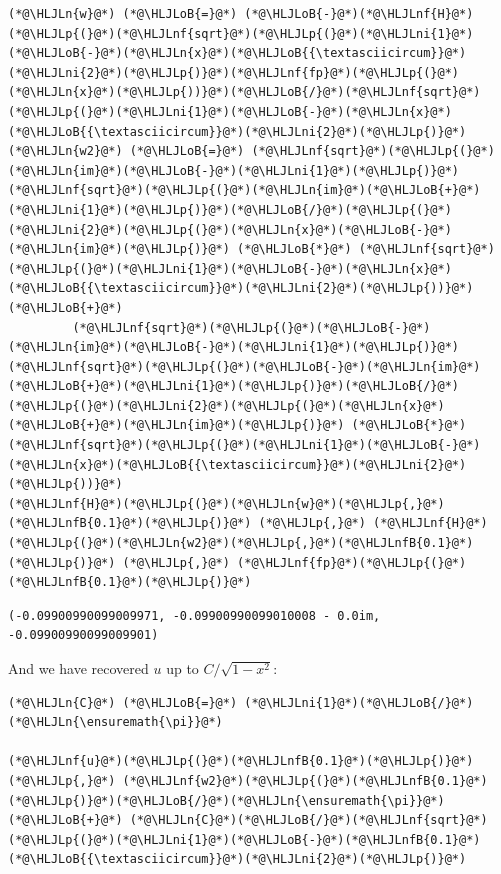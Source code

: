 \documentclass[12pt,a4paper]{article}
\newcommand{\HLJLn}[1]{#1}
\newcommand{\HLJLnf}[1]{\textcolor[RGB]{66,102,213}{#1}}
\newcommand{\HLJLnfB}[1]{\textcolor[RGB]{59,151,46}{#1}}
\newcommand{\HLJLni}[1]{\textcolor[RGB]{59,151,46}{#1}}
\newcommand{\HLJLoB}[1]{\textcolor[RGB]{102,102,102}{\textbf{#1}}}
\newcommand{\HLJLp}[1]{#1}
\begin{document}
\begin{lstlisting}
(*@\HLJLn{w}@*) (*@\HLJLoB{=}@*) (*@\HLJLoB{-}@*)(*@\HLJLnf{H}@*)(*@\HLJLp{(}@*)(*@\HLJLnf{sqrt}@*)(*@\HLJLp{(}@*)(*@\HLJLni{1}@*)(*@\HLJLoB{-}@*)(*@\HLJLn{x}@*)(*@\HLJLoB{{\textasciicircum}}@*)(*@\HLJLni{2}@*)(*@\HLJLp{)}@*)(*@\HLJLnf{fp}@*)(*@\HLJLp{(}@*)(*@\HLJLn{x}@*)(*@\HLJLp{))}@*)(*@\HLJLoB{/}@*)(*@\HLJLnf{sqrt}@*)(*@\HLJLp{(}@*)(*@\HLJLni{1}@*)(*@\HLJLoB{-}@*)(*@\HLJLn{x}@*)(*@\HLJLoB{{\textasciicircum}}@*)(*@\HLJLni{2}@*)(*@\HLJLp{)}@*)
(*@\HLJLn{w2}@*) (*@\HLJLoB{=}@*) (*@\HLJLnf{sqrt}@*)(*@\HLJLp{(}@*)(*@\HLJLn{im}@*)(*@\HLJLoB{-}@*)(*@\HLJLni{1}@*)(*@\HLJLp{)}@*)(*@\HLJLnf{sqrt}@*)(*@\HLJLp{(}@*)(*@\HLJLn{im}@*)(*@\HLJLoB{+}@*)(*@\HLJLni{1}@*)(*@\HLJLp{)}@*)(*@\HLJLoB{/}@*)(*@\HLJLp{(}@*)(*@\HLJLni{2}@*)(*@\HLJLp{(}@*)(*@\HLJLn{x}@*)(*@\HLJLoB{-}@*)(*@\HLJLn{im}@*)(*@\HLJLp{)}@*) (*@\HLJLoB{*}@*) (*@\HLJLnf{sqrt}@*)(*@\HLJLp{(}@*)(*@\HLJLni{1}@*)(*@\HLJLoB{-}@*)(*@\HLJLn{x}@*)(*@\HLJLoB{{\textasciicircum}}@*)(*@\HLJLni{2}@*)(*@\HLJLp{))}@*) (*@\HLJLoB{+}@*)
         (*@\HLJLnf{sqrt}@*)(*@\HLJLp{(}@*)(*@\HLJLoB{-}@*)(*@\HLJLn{im}@*)(*@\HLJLoB{-}@*)(*@\HLJLni{1}@*)(*@\HLJLp{)}@*)(*@\HLJLnf{sqrt}@*)(*@\HLJLp{(}@*)(*@\HLJLoB{-}@*)(*@\HLJLn{im}@*)(*@\HLJLoB{+}@*)(*@\HLJLni{1}@*)(*@\HLJLp{)}@*)(*@\HLJLoB{/}@*)(*@\HLJLp{(}@*)(*@\HLJLni{2}@*)(*@\HLJLp{(}@*)(*@\HLJLn{x}@*)(*@\HLJLoB{+}@*)(*@\HLJLn{im}@*)(*@\HLJLp{)}@*) (*@\HLJLoB{*}@*) (*@\HLJLnf{sqrt}@*)(*@\HLJLp{(}@*)(*@\HLJLni{1}@*)(*@\HLJLoB{-}@*)(*@\HLJLn{x}@*)(*@\HLJLoB{{\textasciicircum}}@*)(*@\HLJLni{2}@*)(*@\HLJLp{))}@*)
(*@\HLJLnf{H}@*)(*@\HLJLp{(}@*)(*@\HLJLn{w}@*)(*@\HLJLp{,}@*)(*@\HLJLnfB{0.1}@*)(*@\HLJLp{)}@*) (*@\HLJLp{,}@*) (*@\HLJLnf{H}@*)(*@\HLJLp{(}@*)(*@\HLJLn{w2}@*)(*@\HLJLp{,}@*)(*@\HLJLnfB{0.1}@*)(*@\HLJLp{)}@*) (*@\HLJLp{,}@*) (*@\HLJLnf{fp}@*)(*@\HLJLp{(}@*)(*@\HLJLnfB{0.1}@*)(*@\HLJLp{)}@*)
\end{lstlisting}

\begin{lstlisting}
(-0.09900990099009971, -0.09900990099010008 - 0.0im, -0.09900990099009901)
\end{lstlisting}


And we have recovered $u$ up to $C/\sqrt{1-x^2}$:


\begin{lstlisting}
(*@\HLJLn{C}@*) (*@\HLJLoB{=}@*) (*@\HLJLni{1}@*)(*@\HLJLoB{/}@*)(*@\HLJLn{\ensuremath{\pi}}@*)

(*@\HLJLnf{u}@*)(*@\HLJLp{(}@*)(*@\HLJLnfB{0.1}@*)(*@\HLJLp{)}@*) (*@\HLJLp{,}@*) (*@\HLJLnf{w2}@*)(*@\HLJLp{(}@*)(*@\HLJLnfB{0.1}@*)(*@\HLJLp{)}@*)(*@\HLJLoB{/}@*)(*@\HLJLn{\ensuremath{\pi}}@*) (*@\HLJLoB{+}@*) (*@\HLJLn{C}@*)(*@\HLJLoB{/}@*)(*@\HLJLnf{sqrt}@*)(*@\HLJLp{(}@*)(*@\HLJLni{1}@*)(*@\HLJLoB{-}@*)(*@\HLJLnfB{0.1}@*)(*@\HLJLoB{{\textasciicircum}}@*)(*@\HLJLni{2}@*)(*@\HLJLp{)}@*)
\end{lstlisting}
\end{document}
